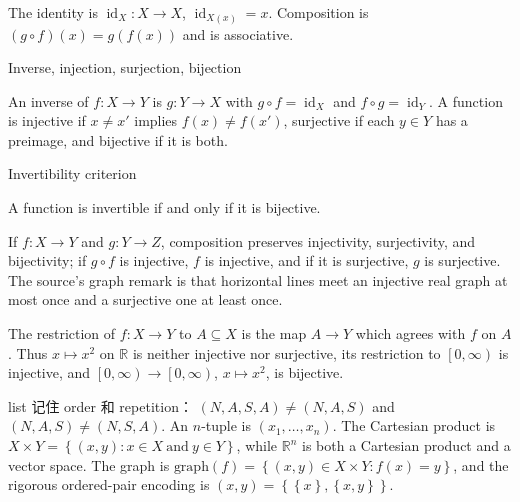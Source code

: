 The identity is \(\operatorname{id}_{X}:X\rightarrow X\), \(\operatorname{id}_{X{(x)}} = x\). Composition is \(\left( {g \circ f} \right)(x) = g\left( {f(x)} \right)\) and is associative.

\begin{definition}{Inverse, injection, surjection, bijection}

An inverse of \(f:X\rightarrow Y\) is \(g:Y\rightarrow X\) with \(g \circ f = \operatorname{id}_{X}\) and \(f \circ g = \operatorname{id}_{Y}\). A function is injective if \(x \neq x'\) implies \(f(x) \neq f\left( x' \right)\), surjective if each \(y \in Y\) has a preimage, and bijective if it is both.

\end{definition}

\begin{theorem}{Invertibility criterion}

A function is invertible if and only if it is bijective.

\end{theorem}

If \(f:X\rightarrow Y\) and \(g:Y\rightarrow Z\), composition preserves injectivity, surjectivity, and bijectivity; if \(g \circ f\) is injective, \(f\) is injective, and if it is surjective, \(g\) is surjective. The source's graph remark is that horizontal lines meet an injective real graph at most once and a surjective one at least once.

The restriction of \(f:X\rightarrow Y\) to \(A \subseteq X\) is the map \(A\rightarrow Y\) which agrees with \(f\) on \(A\). Thus \(x\mapsto x^{2}\) on \(\mathbb{R}\) is neither injective nor surjective, its restriction to \(\left\lbrack {0,\infty} \right)\) is injective, and \(\left\lbrack {0,\infty} \right)\rightarrow\left\lbrack {0,\infty} \right)\), \(x\mapsto x^{2}\), is bijective.

list 记住 order 和 repetition： \(\left( {N,A,S,A} \right) \neq \left( {N,A,S} \right)\) and \(\left( {N,A,S} \right) \neq \left( {N,S,A} \right)\). An \(n\)-tuple is \(\left( {x_{1},\ldots,x_{n}} \right)\). The Cartesian product is \(X \times Y = \left\{ {\left( {x,y} \right):x \in X\ \text{and}\ y \in Y} \right\}\), while \(\mathbb{R}^{n}\) is both a Cartesian product and a vector space. The graph is \(\text{graph}(f) = \left\{ {\left( {x,y} \right) \in X \times Y:f(x) = y} \right\}\), and the rigorous ordered-pair encoding is \(\left( {x,y} \right) = \left\{ {\left\{ x \right\},\left\{ {x,y} \right\}} \right\}\).

